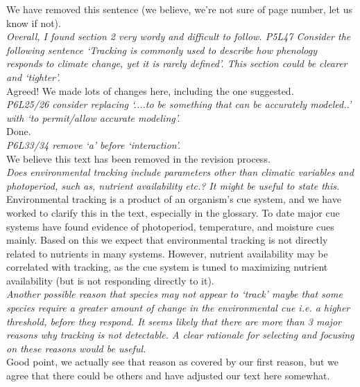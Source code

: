 \documentclass[11pt]{article}
\begin{document}
We have removed this sentence (we believe, we're not sure of page number, let us know if not).\\

\emph{Overall, I found section 2 very wordy and difficult to follow. P5L47 Consider the following
sentence `Tracking is commonly used to describe how phenology responds to climate change, yet
it is rarely defined'. This section could be clearer and `tighter'.}\\

Agreed! We made lots of changes here, including the one suggested.\\

\emph{P6L25/26 consider replacing `....to be something that can be accurately modeled..' with `to
permit/allow accurate modeling'.}\\

Done.\\

\emph{P6L33/34 remove `a' before `interaction'.}\\

We believe this text has been removed in the revision process.\\

\emph{Does environmental tracking include parameters other than climatic variables and photoperiod,
such as, nutrient availability etc.? It might be useful to state this.}\\

Environmental tracking is a product of an organism's cue system, and we have worked to clarify this in the text, especially in the glossary. To date major cue systems have found evidence of photoperiod, temperature, and moisture cues mainly. Based on this we expect that environmental tracking is not directly related to nutrients in many systems. However, nutrient availability may be correlated with tracking, as the cue system is tuned to maximizing nutrient availability (but is not responding directly to it).  \\

\emph{Another possible reason that species may not appear to `track' maybe that some species
require a greater amount of change in the environmental cue i.e. a higher threshold, before they respond. It seems likely that there are more than 3 major reasons why tracking is not detectable. A clear rationale for selecting and focusing on these reasons would be useful.}\\

Good point, we actually see that reason as covered by our first reason, but we agree that there could be others and have adjusted our text here somewhat. \\
\end{document}
